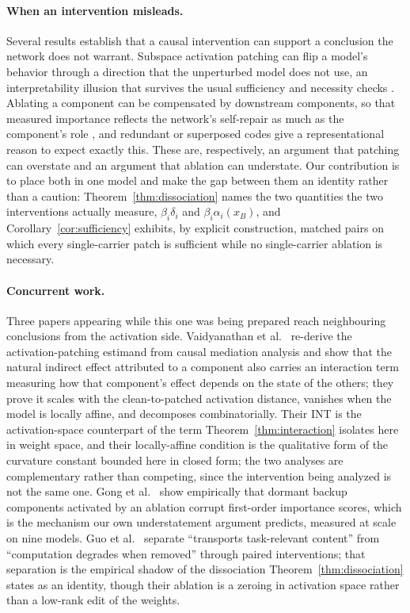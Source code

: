 \documentclass[11pt,a4paper]{article}
\begin{document}
\paragraph{When an intervention misleads.} Several results establish that a
causal intervention can support a conclusion the network does not warrant.
Subspace activation patching can flip a model's behavior through a direction
that the unperturbed model does not use, an interpretability illusion that
survives the usual sufficiency and necessity checks \cite{makelov2024}.
Ablating a component can be compensated by downstream components, so that
measured importance reflects the network's self-repair as much as the
component's role \cite{mcgrath2023}, and redundant or superposed codes
\cite{elhage2022} give a representational reason to expect exactly this.
These are, respectively, an argument that patching can overstate and an
argument that ablation can understate. Our contribution is to place both in
one model and make the gap between them an identity rather than a caution:
Theorem~\ref{thm:dissociation} names the two quantities the two interventions
actually measure, $\beta_i\delta_i$ and $\beta_i\alpha_i(x_B)$, and
Corollary~\ref{cor:sufficiency} exhibits, by explicit construction, matched
pairs on which every single-carrier patch is sufficient while no
single-carrier ablation is necessary.

\paragraph{Concurrent work.} Three papers appearing while this one was being
prepared reach neighbouring conclusions from the activation side.
Vaidyanathan et al.\ \cite{vaidyanathan2026mediators} re-derive the
activation-patching estimand from causal mediation analysis and show that the
natural indirect effect attributed to a component also carries an interaction
term measuring how that component's effect depends on the state of the others;
they prove it scales with the clean-to-patched activation distance, vanishes
when the model is locally affine, and decomposes combinatorially. Their INT is
the activation-space counterpart of the term
Theorem~\ref{thm:interaction} isolates here in weight space, and their
locally-affine condition is the qualitative form of the curvature constant
bounded here in closed form; the two analyses are complementary rather than
competing, since the intervention being analyzed is not the same one.
Gong et al.\ \cite{gong2026coablation} show empirically that dormant backup
components activated by an ablation corrupt first-order importance scores,
which is the mechanism our own understatement argument predicts, measured at
scale on nine models. Guo et al.\ \cite{guo2026sobol} separate ``transports
task-relevant content'' from ``computation degrades when removed'' through
paired interventions; that separation is the empirical shadow of the
dissociation Theorem~\ref{thm:dissociation} states as an identity, though
their ablation is a zeroing in activation space rather than a low-rank edit of
the weights.
\end{document}
